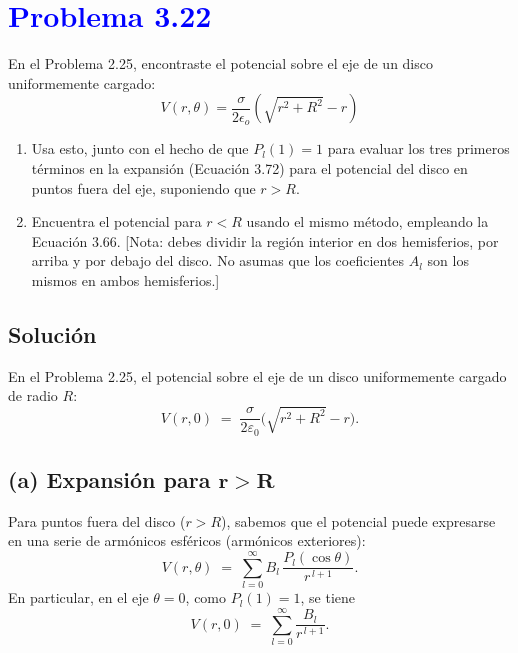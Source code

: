 \documentclass[12pt]{article}
\newcommand{\question}[1]{\textcolor{blue}{\textbf{#1}}}
\begin{document}


\section*{\question{Problema 3.22}}
En el Problema 2.25, encontraste el potencial sobre el eje de un disco uniformemente cargado: 
\[ V(r,\theta) = \frac{\sigma}{2\epsilon_o}(\sqrt{r^2 + R^2}-r)\]
\begin{enumerate}[label=(\alph*)]
  \item   Usa esto, junto con el hecho de que \(P_l(1) = 1\) para evaluar los tres primeros términos en la expansión (Ecuación 3.72) para el potencial del disco en puntos fuera del eje, suponiendo que \(r > R\).

  \item  Encuentra el potencial para \(r < R\) usando el mismo método, empleando la Ecuación 3.66. [Nota: debes dividir la región interior en dos hemisferios, por arriba y por debajo del disco. No asumas que los coeficientes \(A_l\) son los mismos en ambos hemisferios.]
\end{enumerate}

\subsection*{Solución}
En el Problema 2.25, el potencial sobre el eje de un disco uniformemente cargado de radio \(R\):
\[
V(r,0) \;=\; \frac{\sigma}{2\varepsilon_{0}}\bigl(\sqrt{r^{2} + R^{2}} - r \bigr).
\]


\subsection*{(a) Expansión para \(\boldsymbol{r>R}\)}

Para puntos fuera del disco (\(r>R\)), sabemos que el potencial puede expresarse en una serie de armónicos esféricos (armónicos exteriores):
\[
V(r,\theta)
\;=\;
\sum_{l=0}^{\infty} B_{l}\,\frac{P_{l}(\cos\theta)}{r^{\,l+1}}.
\]
En particular, en el eje \(\theta=0\), como \(P_{l}(1)=1\), se tiene
\[
V(r,0)
\;=\;
\sum_{l=0}^{\infty} \frac{B_{l}}{r^{\,l+1}}.
\]
\end{document}
